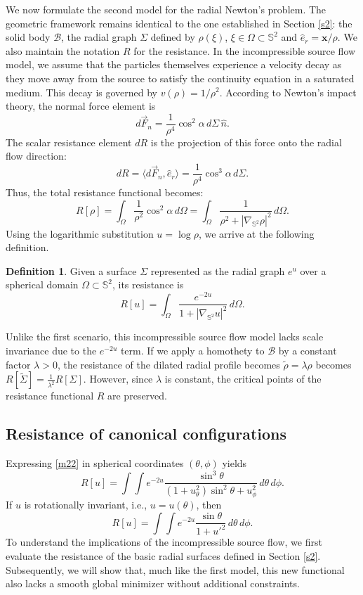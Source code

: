 \documentclass[a4paper,12pt]{amsart}
\theoremstyle{plain}
\theoremstyle{definition}
\newtheorem{definition}[theorem]{Definition}
\def\s{\mathbb S}
\begin{document}
We now formulate the second model for the radial Newton's problem. The geometric framework remains identical to the one established in Section \ref{s2}: the solid body $\mathcal{B}$, the radial graph $\Sigma$ defined by $\rho(\xi)$, $\xi\in\Omega\subset\s^2$ and $\hat{e}_r=\mathbf{x}/\rho$. We also maintain the notation $R$ for the resistance. In the incompressible source flow model, we assume that the particles themselves experience a velocity decay as they move away from the source to satisfy the continuity equation in a saturated medium. This decay is governed by $v(\rho) = 1/\rho^2$. According to Newton's impact theory, the normal force element is 
$$d\vec{F}_n = \frac{1}{\rho^4} \cos^2 \alpha \, d\Sigma \, \hat{n}.$$
 The scalar resistance element $dR$ is the projection of this force onto the radial flow direction:
$$dR = \langle d\vec{F}_n, \hat{e}_r \rangle = \frac{1}{\rho^4} \cos^3 \alpha \, d\Sigma.$$
Thus, the total resistance functional becomes:
$$R[\rho] = \int_{\Omega} \frac{1}{\rho^2} \cos^2 \alpha \, d\Omega = \int_{\Omega} \frac{1}{\rho^2 + |\nabla_{\mathbb{S}^2} \rho|^2} \, d\Omega.$$
Using the logarithmic substitution $u = \log \rho$, we arrive at the following definition. 


\begin{definition} 
Given a surface $\Sigma$ represented as the radial graph $e^u$ over a spherical domain $\Omega\subset\s^2$, its resistance is 
\begin{equation} \label{m22}
 R[u] = \int_{\Omega} \frac{e^{-2u}}{1 + |\nabla_{\mathbb{S}^2} u|^2} \, d\Omega.
\end{equation}
\end{definition}

 
 Unlike the first scenario, this incompressible source flow model lacks scale invariance  due to the $e^{-2u}$ term. If we apply a homothety to $\mathcal{B}$ by a constant factor $\lambda > 0$, the resistance of the dilated radial profile becomes $\tilde{\rho} = \lambda \rho$ becomes $ R[\tilde{\Sigma}] = \frac{1}{\lambda^2} R[\Sigma]$. However, since $\lambda$ is constant, the critical points of the resistance functional $R$ are preserved. 
 
 \subsection{Resistance of  canonical configurations}
 
Expressing \eqref{m22} in spherical coordinates $(\theta,\phi)$  yields 
$$R[u]=\int\int e^{-2u}\frac{\sin^3\theta}{(1+u_\theta^2)\sin^2\theta+u_\phi^2}\, d\theta\, d\phi.$$
If $u$ is rotationally invariant, i.e., $u=u(\theta)$, then 
$$R[u]=\int\int e^{-2u}\frac{\sin \theta}{ 1+u'^2}\, d\theta\, d\phi.$$
To understand the implications of the incompressible source flow, 
we first evaluate the resistance of the basic radial surfaces defined in Section \ref{s2}. Subsequently, 
we will show that, much like the first model, this new functional also lacks a smooth global minimizer 
without additional constraints.
\end{document}
